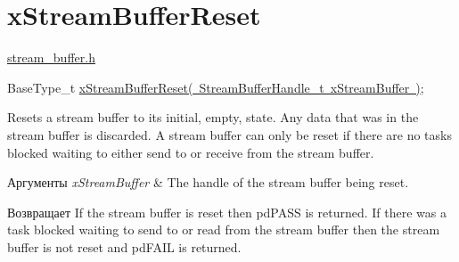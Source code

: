 \hypertarget{group__x_stream_buffer_reset}{}\section{x\+Stream\+Buffer\+Reset}
\label{group__x_stream_buffer_reset}
\mbox{\hyperlink{stream__buffer_8h}{stream\+\_\+buffer.\+h}}


\begin{DoxyPre}
BaseType\_t \mbox{\hyperlink{stream__buffer_8h_a5253429645c67902c2fc8682f8af0aac}{xStreamBufferReset( StreamBufferHandle\_t xStreamBuffer )}};
\end{DoxyPre}


Resets a stream buffer to its initial, empty, state. Any data that was in the stream buffer is discarded. A stream buffer can only be reset if there are no tasks blocked waiting to either send to or receive from the stream buffer.


\begin{DoxyParams}{Аргументы}
{\em x\+Stream\+Buffer} & The handle of the stream buffer being reset.\\
\hline
\end{DoxyParams}
\begin{DoxyReturn}{Возвращает}
If the stream buffer is reset then pd\+P\+A\+SS is returned. If there was a task blocked waiting to send to or read from the stream buffer then the stream buffer is not reset and pd\+F\+A\+IL is returned. 
\end{DoxyReturn}
